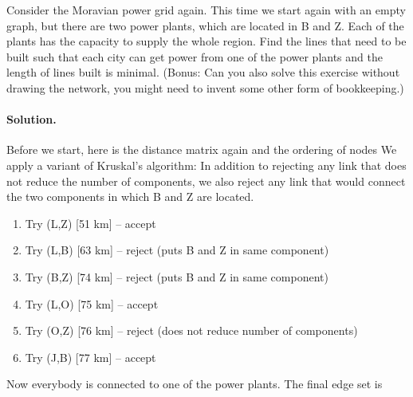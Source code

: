 

Consider the Moravian power grid again. This time we start again with an empty graph, but there are two power plants, which are located in B and Z. Each of the plants has the capacity to supply the whole region. Find the lines that need to be built such that each city can get power from one of the power plants and the length of lines built is minimal. (Bonus: Can you also solve this exercise without drawing the network, you might need to invent some other form of bookkeeping.)


\solution
\paragraph{Solution.}Before we start, here is the distance matrix again 
and the ordering of nodes 
We apply a variant of Kruskal's algorithm: In addition to rejecting any link that does not reduce the number of components, we also reject any link that would connect the two components in which B and Z are located.
\begin{enumerate}[label=\arabic*.]
\item Try (L,Z) [51 km] -- accept
\item Try (L,B) [63 km] -- reject (puts B and Z in same component)
\item Try (B,Z) [74 km] -- reject (puts B and Z in same component)
\item Try (L,O) [75 km] -- accept
\item Try (O,Z) [76 km] -- reject (does not reduce number of components)
\item Try (J,B) [77 km] -- accept
\end{enumerate}
Now everybody is connected to one of the power plants. The final edge set is 
